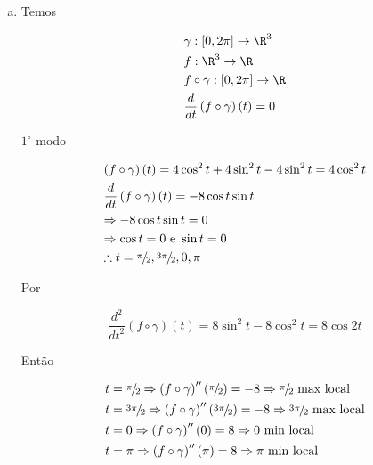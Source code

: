\documentclass{book}
\begin{document}
\begin{sol}
\begin{enumerate}[(a)]
  \item Temos

\[
\begin{gathered}
  \gamma :\left[ {0,2\pi } \right] \to \R^3  \hfill \\
  f:\R^3  \to \R \hfill \\
  f \circ \gamma :\left[ {0,2\pi } \right] \to \R \hfill \\
  \frac{d}
{{dt}}\left( {f \circ \gamma } \right)\left( t \right) = 0 \hfill \\
\end{gathered}
\]

$1^\circ$ modo

\[
\begin{gathered}
  \left( {f \circ \gamma } \right)\left( t \right) = 4\cos ^2 t + 4\sin ^2 t - 4\sin ^2 t = 4\cos ^2 t \hfill \\
  \frac{d}
{{dt}}\left( {f \circ \gamma } \right)\left( t \right) =  - 8\cos t\sin t \hfill \\
   \Rightarrow  - 8\cos t\sin t = 0 \hfill \\
   \Rightarrow \cos t = 0{\text{ e }}\sin t = 0 \hfill \\
  \therefore t = {\raise0.5ex\hbox{$\scriptstyle \pi $}
\kern-0.1em/\kern-0.15em
\lower0.25ex\hbox{$\scriptstyle 2$}},{\raise0.5ex\hbox{$\scriptstyle {3\pi }$}
\kern-0.1em/\kern-0.15em
\lower0.25ex\hbox{$\scriptstyle 2$}},0,\pi  \hfill \\
\end{gathered}
\]

Por

\[
\frac{{d^2 }}
{{dt^2 }}\left( {f \circ \gamma } \right)\left( t \right) = 8\sin ^2 t - 8\cos ^2 t = 8\cos 2t
\]

Ent\~ao

\[
\begin{gathered}
  t = {\raise0.5ex\hbox{$\scriptstyle \pi $}
\kern-0.1em/\kern-0.15em
\lower0.25ex\hbox{$\scriptstyle 2$}} \Rightarrow \left( {f \circ \gamma } \right)''\left( {{\raise0.5ex\hbox{$\scriptstyle \pi $}
\kern-0.1em/\kern-0.15em
\lower0.25ex\hbox{$\scriptstyle 2$}}} \right) =  - 8 \Rightarrow {\raise0.5ex\hbox{$\scriptstyle \pi $}
\kern-0.1em/\kern-0.15em
\lower0.25ex\hbox{$\scriptstyle 2$}}{\text{ max local}} \hfill \\
  t = {\raise0.5ex\hbox{$\scriptstyle {3\pi }$}
\kern-0.1em/\kern-0.15em
\lower0.25ex\hbox{$\scriptstyle 2$}} \Rightarrow \left( {f \circ \gamma } \right)''\left( {{\raise0.5ex\hbox{$\scriptstyle {3\pi }$}
\kern-0.1em/\kern-0.15em
\lower0.25ex\hbox{$\scriptstyle 2$}}} \right) =  - 8 \Rightarrow {\raise0.5ex\hbox{$\scriptstyle {3\pi }$}
\kern-0.1em/\kern-0.15em
\lower0.25ex\hbox{$\scriptstyle 2$}}{\text{ max local}} \hfill \\
  t = 0 \Rightarrow \left( {f \circ \gamma } \right)''\left( 0 \right) = 8 \Rightarrow 0{\text{ min local}} \hfill \\
  t = \pi  \Rightarrow \left( {f \circ \gamma } \right)''\left( \pi  \right) = 8 \Rightarrow \pi {\text{ min local}} \hfill \\
\end{gathered}
\]


\end{enumerate}
\end{sol}
\end{document}
